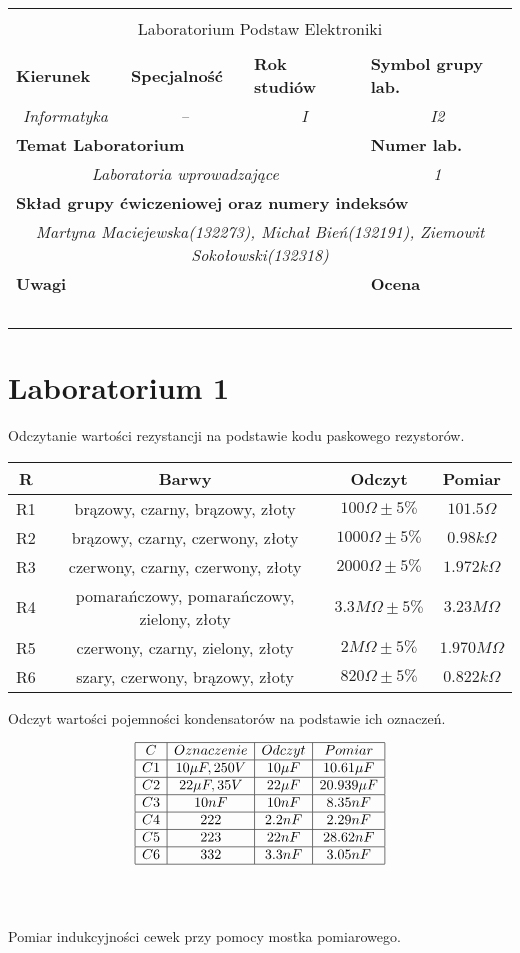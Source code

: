 \documentclass[11pt]{article}
\newcommand{\PRzFieldDsc}[1]{\sffamily\bfseries\scriptsize #1}
\newcommand{\PRzFieldCnt}[1]{\textit{#1}}
\newcommand{\PRzHeading}[8]{
\begin{center}
\begin{tabular}{ p{0.32\textwidth} p{0.15\textwidth} p{0.15\textwidth} p{0.12\textwidth} p{0.12\textwidth} }

  &   &   &   &   \\
\hline
\multicolumn{5}{|c|}{}\\[-1ex]
\multicolumn{5}{|c|}{{\LARGE #1}}\\
\multicolumn{5}{|c|}{}\\[-1ex]

\hline
\multicolumn{1}{|l|}{\PRzFieldDsc{Kierunek}}	& \multicolumn{1}{|l|}{\PRzFieldDsc{Specjalność}}	& \multicolumn{1}{|l|}{\PRzFieldDsc{Rok studiów}}	& \multicolumn{2}{|l|}{\PRzFieldDsc{Symbol grupy lab.}} \\
\multicolumn{1}{|c|}{\PRzFieldCnt{#2}}		& \multicolumn{1}{|c|}{\PRzFieldCnt{#3}}		& \multicolumn{1}{|c|}{\PRzFieldCnt{#4}}		& \multicolumn{2}{|c|}{\PRzFieldCnt{#5}} \\

\hline
\multicolumn{4}{|l|}{\PRzFieldDsc{Temat Laboratorium}}		& \multicolumn{1}{|l|}{\PRzFieldDsc{Numer lab.}} \\
\multicolumn{4}{|c|}{\PRzFieldCnt{#6}}				& \multicolumn{1}{|c|}{\PRzFieldCnt{#7}} \\

\hline
\multicolumn{5}{|l|}{\PRzFieldDsc{Skład grupy ćwiczeniowej oraz numery indeksów}}\\
\multicolumn{5}{|c|}{\PRzFieldCnt{#8}}\\

\hline
\multicolumn{3}{|l|}{\PRzFieldDsc{Uwagi}}	& \multicolumn{2}{|l|}{\PRzFieldDsc{Ocena}} \\
\multicolumn{3}{|c|}{\PRzFieldCnt{\ }}		& \multicolumn{2}{|c|}{\PRzFieldCnt{\ }} \\

\hline
\end{tabular}
\end{center}
}
\begin{document}
\PRzHeading{Laboratorium Podstaw Elektroniki}{Informatyka}{--}{I}{I2}{Laboratoria wprowadzające}{1}{Martyna Maciejewska(132273), Michał Bień(132191), Ziemowit Sokołowski(132318)}{}


\section{Laboratorium 1}
\begin{center}
Odczytanie wartości rezystancji na podstawie kodu paskowego rezystorów.
\begin{tabular}{|c|c|c|c|}
\hline
R&Barwy&Odczyt&Pomiar\\
\hline 
R1&brązowy, czarny, brązowy, złoty&$100\Omega\pm 5\%$ & $101.5\Omega$\\
\hline
 R2& brązowy, czarny, czerwony, złoty & $1000\Omega\pm 5\%$ & $0.98k\Omega$ \\
\hline
 R3& czerwony, czarny, czerwony, złoty & $2000\Omega\pm 5\%$ & $1.972k\Omega$ \\
\hline
 R4& pomarańczowy, pomarańczowy, zielony, złoty & $3.3M\Omega\pm 5\%$ & $3.23M\Omega$ \\
\hline
 R5& czerwony, czarny, zielony, złoty & $2M\Omega\pm 5\%$ & $1.970M\Omega$ \\
\hline
 R6& szary, czerwony, brązowy, złoty & $820\Omega\pm 5\%$ & $0.822k\Omega$ \\
\hline
\end{tabular}
\newline
\end{center}
\begin{center}
Odczyt wartości pojemności kondensatorów na podstawie ich oznaczeń.
\end{center}
$$
\begin{array}{|c|c|c|c|}
\hline
 C&Oznaczenie&Odczyt&Pomiar\\
\hline 
C1&10\mu F,  250V&10\mu F& 10.61\mu F\\
\hline
C2&22\mu F,  35V&22\mu F& 20.939\mu F\\
\hline
C3&10nF&10nF& 8.35nF\\
\hline
 C4&222&2.2nF& 2.29nF\\
\hline
 C5&223&22nF&28.62nF\\
\hline
C6&332&3.3nF&3.05nF\\
\hline
\end{array}
$$
\\
\\
\begin{center}
Pomiar indukcyjności cewek przy pomocy mostka pomiarowego.
\end{center}
\end{document}
